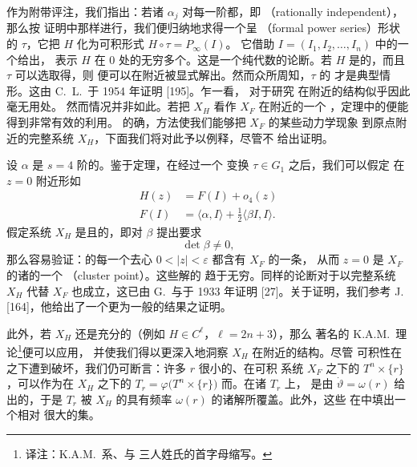 作为附带评注，我们指出：若诸 $\alpha_j$ 对每一阶都\trNonresonance，即%
\textbf{\trRationallyIndependent}（rationally independent），那么按%
\trNormalForm{}证明中那样进行，我们便归纳地求得一个呈\textbf{\trFormalPowerSeries}%
（formal power series）\trMapping{}形状的\trSymplectic\trMapping{}%
$\tau$，它把\trHamiltonianFunction{} $H$ 化为可积形式 $H\circ\tau=P_\infty(I)$。%
它借助\trFirstIntegral{} $I=(I_1,I_2,\dotsc,I_n)$ 中的一个\trFormalPowerSeries{}给出，%
表示 $H$ 在 $0$ 处的无穷多个\trSymplecticInvariant。这是一个纯代数的论断。若%
$H$ 是\trAnalytic{}的，而且 $\tau$ 可以选取得\trConverge，则\trHamiltonianSystem{}%
便可以在\trEquilibrium{}附近被显式解出。然而众所周知，$\tau$ 的\trDivergence{}%
才是典型情形。这由 C.~L.~\trSiegel{}于 1954 年证明 [195]。乍一看，%
\trNormalForm{}对于研究%
\trHamiltonianSystem{}在\trEquilibrium{}附近的\trOrbit{}结构似乎因此毫无用处。%
然而情况并非如此。若把 $X_H$ 看作\trIntegrableSystem{} $X_F$ 在\trEquilibrium{}附近的一个%
\trPerturbation，\trBirkhoff{}定理中的\trNormalForm{}便能得到非常有效的利用。%
的确，\trPerturbation{}方法使我们能够把\trIntegrableSystem{} $X_F$ 的某些动力学现象%
\trContinuation{}到原点附近的完整系统 $X_H$，下面我们将对此予以例释，尽管不%
给出证明。

设 $\alpha$ 是 $s=4$ 阶\trNonresonance{}的。鉴于\trBirkhoff{}定理，在经过一个%
\trNonlinear\trSymplectic{}变换 $\tau\in G_1$ 之后，我们可以假定%
\trHamiltonianFunction{}在 $z=0$ 附近形如
\begin{align*}
H(z) &= F(I)+o_4(z)\\
F(I) &= \langle\alpha,I\rangle+\frac{1}{2}\langle\beta I,I\rangle.
\end{align*}
假定系统 $X_H$ 是\trNonlinear{}且\trNondegenerate{}的，即对\trSymplecticInvariant{}%
$\beta$ 提出要求
\[
\det\beta\neq0,
\]
那么容易验证：\trEquilibrium{}的每一个去心\trNeighborhood{}%
$0<|z|<\varepsilon$ 都含有\trIntegrableSystem{} $X_F$ 的一条\trPeriodicSolution，%
从而 $z=0$ 是 $X_F$ 的诸\trPeriodicSolution{}的一个\textbf{\trAccumulationPoint}%
（cluster point）。这些解的%
\trPeriodic{}趋于无穷。同样的论断对于以完整系统 $X_H$ 代替 $X_F$ 也成立，这已由%
G.~\trBirkhoff{}与\trLewis{}于 1933 年证明 [27]。关于证明，我们参考%
J.~\trMoser{} [164]，他给出了一个更为一般的结果之证明。

此外，若 $X_H$ 还是充分\trSmooth{}的（例如 $H\in C^{\ell}$，$\ell=2n+3$），那么%
著名的 K.A.M.~理论\footnote{译注：K.A.M.~系\trKolmogorov、\trArnold{}与%
\trMoser{}三人姓氏的首字母缩写。}便可以应用，%
并使我们得以更深入地洞察 $X_H$ 在\trEquilibrium{}附近的\trOrbit{}结构。尽管%
可积性在\trPerturbation{}之下遭到破坏，我们仍可断言：许多 $r$ 很小的、在可积%
系统 $X_F$ 之下\trInvariant{}的\trTorus{} $T^{n}\times\{r\}$，可以作为在\trFlow{}%
$X_H$ 之下\trInvariant{}的\trEmbedding{}\trLagrange{}\trTorus{}%
$T_r=\varphi\bigl(T^{n}\times\{r\}\bigr)$ 而\trContinuation。在诸\trTorus{} $T_r$ 上，%
\trFlow{}是由 $\dot{\vartheta}=\omega(r)$ 给出的\trKronecker\trFlow，于是 $T_r$ 被%
$X_H$ 的具有频率 $\omega(r)$ 的诸\trQuasiPeriodic{}解所覆盖。此外，这些%
\trInvariant\trTorus{}在\trPhaseSpace{}中填出一个\trLebesgue{}\trMeasure{}相对%
很大的\trCantor{}集。


